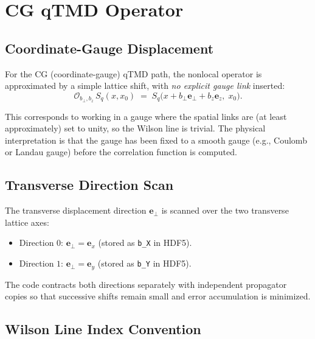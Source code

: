\documentclass[11pt,a4paper]{article}
\begin{document}
\section{CG qTMD Operator}
\label{sec:cg_tmd_op}

\subsection{Coordinate-Gauge Displacement}

For the CG (coordinate-gauge) qTMD path, the nonlocal operator is approximated
by a simple lattice shift, with \emph{no explicit gauge link} inserted:
\begin{equation}
  \mathcal{O}_{b_\perp,b_z}\, S_q(x, x_0)
  \;=\;
  S_q\bigl(x + b_\perp \mathbf{e}_\perp + b_z \mathbf{e}_z,\; x_0\bigr).
  \label{eq:cg_shift}
\end{equation}

This corresponds to working in a gauge where the spatial links are (at least
approximately) set to unity, so the Wilson line is trivial.  The physical
interpretation is that the gauge has been fixed to a smooth gauge (e.g.,
Coulomb or Landau gauge) before the correlation function is computed.

\subsection{Transverse Direction Scan}

The transverse displacement direction $\mathbf{e}_\perp$ is scanned over the
two transverse lattice axes:
\begin{itemize}[nosep]
  \item Direction $0$: $\mathbf{e}_\perp = \mathbf{e}_x$ (stored as
        \texttt{b\_X} in HDF5).
  \item Direction $1$: $\mathbf{e}_\perp = \mathbf{e}_y$ (stored as
        \texttt{b\_Y} in HDF5).
\end{itemize}
The code contracts both directions separately with independent propagator copies
so that successive shifts remain small and error accumulation is minimized.

\subsection{Wilson Line Index Convention}
\end{document}
